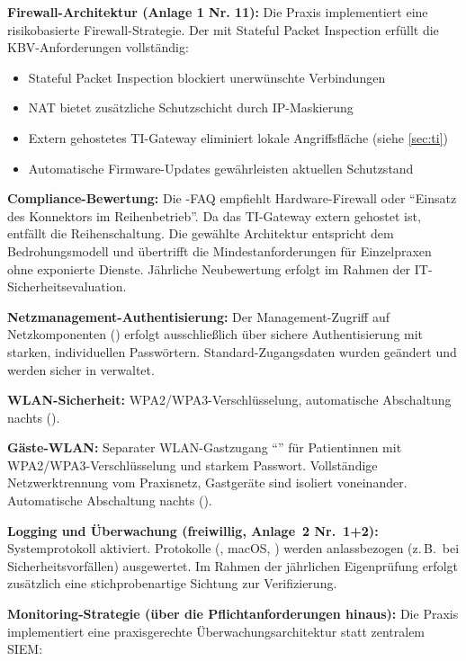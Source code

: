 \textbf{Firewall-Architektur (Anlage 1 Nr. 11):} Die Praxis implementiert eine
risikobasierte Firewall-Strategie. Der \RouterModell{} mit Stateful Packet Inspection
erfüllt die KBV-Anforderungen vollständig:

\begin{itemize}
  \item Stateful Packet Inspection blockiert unerwünschte Verbindungen
  \item NAT bietet zusätzliche Schutzschicht durch IP-Maskierung
  \item Extern gehostetes TI-Gateway eliminiert lokale Angriffsfläche (siehe \cref{sec:ti})
  \item Automatische Firmware-Updates gewährleisten aktuellen Schutzstand
\end{itemize}

\textbf{Compliance-Bewertung:} Die \KV-FAQ empfiehlt Hardware-Firewall oder
``Einsatz des Konnektors im Reihenbetrieb''. Da das TI-Gateway extern gehostet
ist, entfällt die Reihenschaltung. Die gewählte Architektur entspricht dem
Bedrohungsmodell und übertrifft die Mindestanforderungen für Einzelpraxen
ohne exponierte Dienste. Jährliche Neubewertung erfolgt im Rahmen der
IT-Sicherheitsevaluation.

\textbf{Netzmanagement-Authentisierung:} Der Management-Zugriff auf Netz\-kom\-po\-nen\-ten (\RouterKurz{}) erfolgt ausschließlich über sichere Authentisierung mit starken, individuellen Passwörtern. Standard-Zugangsdaten wurden geändert und werden sicher in \PasswortManager{} verwaltet.

\textbf{WLAN-Sicherheit:} WPA2\slash WPA3-Ver\-schlüs\-se\-lung, automatische Abschaltung nachts
(\WLANAbschaltung).

\textbf{Gäste-WLAN:} Separater WLAN-Gastzugang \enquote{\WLANGastName} für Patientinnen mit
WPA2\slash WPA3-Ver\-schlüs\-se\-lung und starkem Passwort. Vollständige Netz\-werk\-tren\-nung vom
Praxisnetz, Gastgeräte sind isoliert voneinander. Automatische Abschaltung nachts
(\WLANAbschaltung).

\textbf{Logging und Überwachung (freiwillig, Anlage~2 Nr.~1+2):} Systemprotokoll
aktiviert. Protokolle (\RouterKurz{}, macOS, \PVSName{}) werden anlassbezogen (z.\,B.\ bei
Sicherheitsvorfällen) ausgewertet. Im Rahmen der jährlichen Eigenprüfung erfolgt
zusätzlich eine stichprobenartige Sichtung zur Verifizierung.

\textbf{Monitoring-Strategie (über die Pflichtanforderungen hinaus):} Die Praxis implementiert eine
praxisgerechte Überwachungsarchitektur statt zentralem SIEM:

